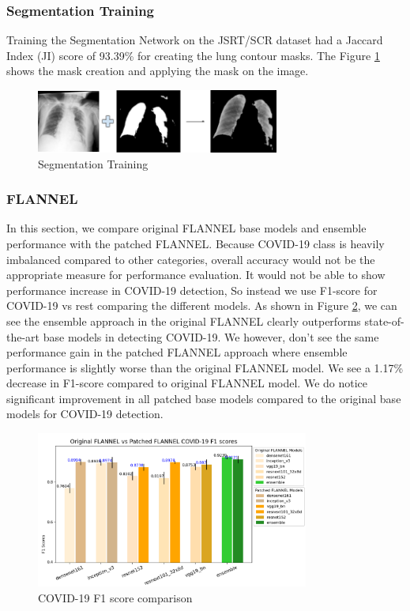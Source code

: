 \documentclass{sigkddExp}
\begin{document}
\subsubsection{Segmentation Training}
Training the Segmentation Network on the JSRT/SCR dataset had a Jaccard Index
(JI) score of 93.39\% for creating the lung contour masks. The Figure \ref{fig:segtrain}
shows the mask creation and applying the mask on the image.

\begin{figure}[h]
    \includegraphics[width=8cm]{../doc/images/segmentation_training.png}
    \caption{Segmentation Training}
    \label{fig:segtrain}
\end{figure}

\subsubsection{FLANNEL}

In this section, we compare original FLANNEL base models and ensemble
performance with the patched FLANNEL. Because COVID-19 class is heavily
imbalanced compared to other categories, overall accuracy would not be the
appropriate measure for performance evaluation. It would not be able to show
performance increase in COVID-19 detection, So instead we use F1-score for
COVID-19 vs rest comparing the different models. As shown in Figure
\ref{fig:f1score}, we can see the ensemble approach in the original FLANNEL
clearly outperforms state-of-the-art base models in detecting COVID-19. We
however, don’t see the same performance gain in the patched FLANNEL approach
where ensemble performance is slightly worse than the original FLANNEL model. We
see a 1.17\% decrease in F1-score compared to original FLANNEL model. We do
notice significant improvement in all patched base models compared to the
original base models for COVID-19 detection.

\begin{figure}[h]
    \centering
    \includegraphics[width=0.8\textwidth]{../doc/images/original_vs_patched_flannel_f1.png}
    \caption{COVID-19 F1 score comparison}
    \label{fig:f1score}
\end{figure}
\end{document}

